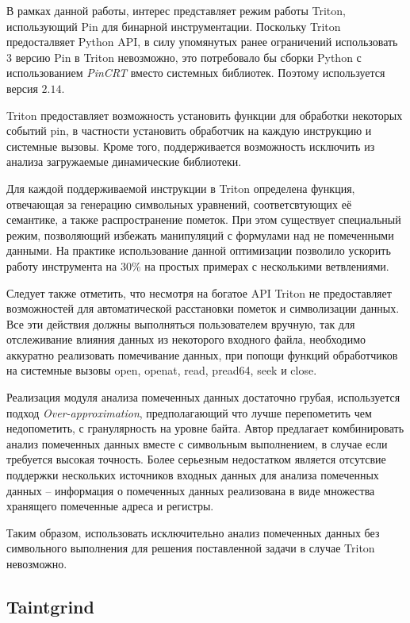 В рамках данной работы, интерес представляет режим работы Triton, использующий Pin для бинарной инструментации. Поскольку Triton предосталвяет Python API, в силу упомянутых ранее ограничений  использовать $3$ версию Pin в Triton невозможно, это потребовало бы сборки Python с использованием \emph{PinCRT} вместо системных библиотек. Поэтому используется версия $2.14$.

Triton предоставляет возможность установить функции для обработки некоторых событий pin, в частности установить обработчик на каждую инструкцию и системные вызовы. Кроме того, поддерживается возможность исключить из анализа загружаемые динамические библиотеки.

Для каждой поддерживаемой инструкции в Triton определена функция, отвечающая за генерацию символьных уравнений, соответсвтующих её семантике, а также распространение пометок. При этом существует специальный режим, позволяющий избежать манипуляций с формулами над не помеченными данными. На практике использование данной оптимизации позволило ускорить работу инструмента на 30\% на простых примерах с несколькими ветвлениями.

Следует также отметить, что несмотря на богатое API Triton не предоставляет возможностей для автоматической расстановки пометок и символизации данных. Все эти действия должны выполняться пользователем вручную, так для отслеживание влияния данных из некоторого входного файла, необходимо аккуратно реализовать помечивание данных, при попощи функций обработчиков на системные вызовы open, openat, read, pread64, seek и close.

Реализация модуля анализа помеченных данных достаточно грубая, используется подход 
\emph{Over-approximation}, предполагающий что лучше перепометить чем недопометить, с гранулярность на уровне байта. Автор предлагает комбинировать анализ помеченных данных вместе с символьным выполнением, в случае если требуется высокая точность.
Более серьезным недостатком является отсутсвие поддержки нескольких источников входных данных для анализа помеченных данных -- информация о помеченных данных реализована в виде множества хранящего помеченные адреса и регистры.

Таким образом, использовать исключительно анализ помеченных данных без символьного выполнения для решения поставленной задачи в случае Triton невозможно.

\subsection{Taintgrind}

